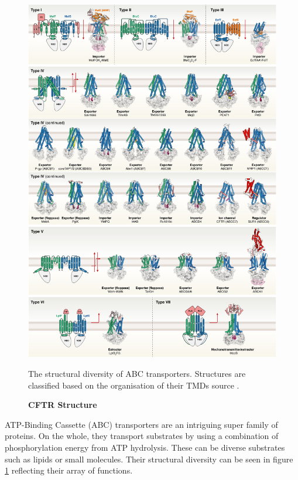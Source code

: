 \begin{figure}
	\label{ABC_diversity}
	\begin{center}
	\includegraphics[width=\textwidth]{figures/ABC_classification.jpg}
	\end{center}
	\captionsetup{singlelinecheck = false, justification=raggedright}
	\caption[CFTR Structure] {\textbf{CFTR Structure}}{The structural diversity of ABC transporters. Structures are classified based on the organisation of their TMDs source \cite{thomas2020}.} 
\end{figure}
ATP-Binding Cassette (ABC) transporters are an intriguing super family of proteins. On the whole, they transport substrates by using a combination of phosphorylation energy from ATP hydrolysis. These can be diverse substrates such as lipids or small molecules. Their structural diversity can be seen in figure \ref{ABC_diversity} reflecting their array of functions. 

